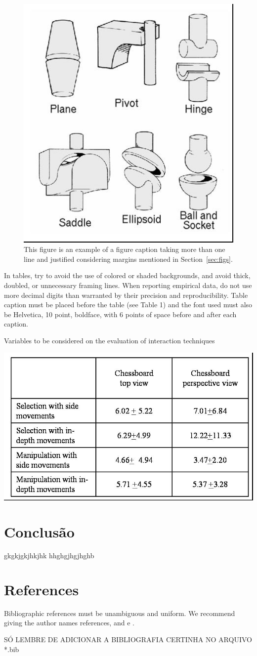 \documentclass[12pt]{article}
\begin{document}
\begin{figure}[ht]
\centering
\includegraphics[width=.3\textwidth]{fig2.jpg}
\caption{This figure is an example of a figure caption taking more than one
  line and justified considering margins mentioned in Section~\ref{sec:figs}.}
\label{fig:exampleFig2}
\end{figure}

In tables, try to avoid the use of colored or shaded backgrounds, and avoid
thick, doubled, or unnecessary framing lines. When reporting empirical data,
do not use more decimal digits than warranted by their precision and
reproducibility. Table caption must be placed before the table (see Table 1)
and the font used must also be Helvetica, 10 point, boldface, with 6 points of
space before and after each caption.

\begin{table}[ht]
\centering
\caption{Variables to be considered on the evaluation of interaction
  techniques}
\label{tab:exTable1}
\includegraphics[width=.7\textwidth]{table.jpg}
\end{table}

\section{Conclusão}
gkgkjgkjhkjhk
hhghgjhgjhghb

\section{References}

Bibliographic references must be unambiguous and uniform.  We recommend giving
the author names references, and \cite{smith:99} \cite{barbosa:97} e \cite{rau:11}.
\cite{kishimoto:08}

SÓ LEMBRE DE ADICIONAR A BIBLIOGRAFIA CERTINHA NO ARQUIVO *.bib



\end{document}
